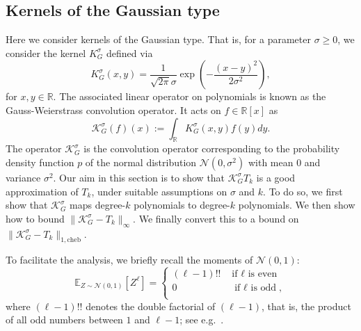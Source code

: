 \documentclass[11pt]{article}
\newcommand{\R}{\mathbb{R}}
\theoremstyle{definition}
\DeclareMathOperator{\poly}{poly}
\newcommand{\cheb}{{1,\mathrm{cheb}}}
\newcommand{\SG}[1]{\textcolor{orange}{[SG: #1]}}
\begin{document}

\subsection{Kernels of the Gaussian type}
\label{sec:Gaussian}

Here we consider kernels of the Gaussian type. That is, for a parameter $\sigma \geq 0$, we consider the kernel $K_G^\sigma$ defined via
\[
K^\sigma_G(x,y) = \frac{1}{\sqrt{2\pi}\sigma}\exp{\left(-\frac{(x-y)^2}{2\sigma^2}\right)},
\]
for $x,y \in \R$. The associated linear operator on polynomials is known as the Gauss-Weierstrass convolution operator. It acts on $f \in \R[x]$ as
\[
\mathcal{K}^\sigma_G(f)(x) := \int_{\R} K^\sigma_G(x,y) f(y)dy.
\]
The operator $\mathcal K_G^\sigma$ is the convolution operator corresponding to the probability density function $p$ of the normal distribution $\mathcal N(0,\sigma^2)$ with mean $0$ and variance $\sigma^2$. Our aim in this section is to show that $\mathcal K_G^\sigma T_k$ is a good approximation of $T_k$, under suitable assumptions on $\sigma$ and $k$.
To do so, we first show that $\mathcal K_G^\sigma$ maps degree-$k$ polynomials to degree-$k$ polynomials. We then show how to bound $\|\mathcal K_G^\sigma - T_k \|_\infty$. We finally convert this to a bound on $\|\mathcal K_G^\sigma - T_k \|_\cheb$.

{
To facilitate the analysis, we briefly recall the moments of $\mathcal N(0,1)$:
\begin{equation} \label{eq:Gaussmoments}
 \mathbb E_{Z \sim \mathcal N(0,1)} [Z^{\ell}] =
 \left\{
\begin{array}{lr}
    (\ell-1)!! & \mbox{ if $\ell$ is even} \\
    0 & \mbox{ if $\ell$ is odd}, \\
\end{array} \right.
\end{equation}}
where $(\ell-1)!!$ denotes the double factorial of $(\ell-1)$, that is, the product of all odd numbers between $1$ and $\ell-1$; see e.g.\ \cite[p. 89]{Kotz}.
\end{document}
